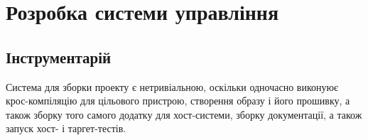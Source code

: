 \documentclass[oneside,14pt,a4paper,final]{myextreport}
\begin{document}
\chapter{Розробка системи управління}

\section{Інструментарій}

Система для зборки проекту є нетривіальною, оскільки одночасно виконуює крос-компіляцію для цільового пристрою, створення образу і його прошивку, а також зборку того самого додатку для хост-системи, зборку документації, а також запуск хост- і таргет-тестів.
\end{document}
